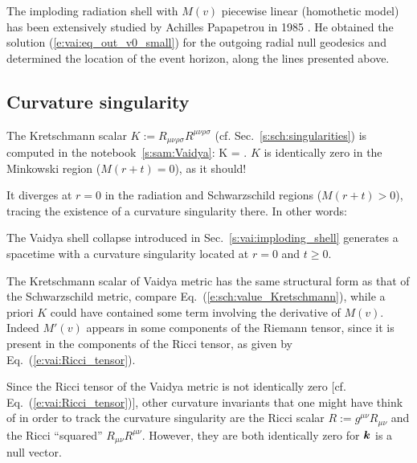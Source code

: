 \begin{hist}
The imploding radiation shell with $M(v)$ piecewise linear (homothetic model)
has been extensively
studied by Achilles Papapetrou in 1985 \cite{Papap85}.
He obtained the solution (\ref{e:vai:eq_out_v0_small}) for the outgoing radial
null geodesics and determined the location of the event horizon, along
the lines presented above.
\end{hist}

\subsection{Curvature singularity} \label{s:vai:thin:sing}

The Kretschmann scalar
$K := R_{\mu\nu\rho\sigma} R^{\mu\nu\rho\sigma}$
(cf. Sec.~\ref{s:sch:singularities})
is computed in the notebook~\ref{s:sam:Vaidya}:
\be \label{e:vai:Kretschmann}
    K =  .
\ee
$K$ is identically zero in the Minkowski region ($M(r+t) = 0$), as it should!

It diverges at $r=0$ in the radiation and Schwarzschild regions ($M(r+t) > 0$), tracing the
existence of a curvature singularity there.
In other words:
\begin{greybox}
The Vaidya shell collapse introduced in Sec.~\ref{s:vai:imploding_shell}
generates a spacetime with a curvature singularity
located at $r=0$ and $t \geq 0$.
\end{greybox}

\begin{remark}
The Kretschmann scalar of Vaidya metric has the same structural form
as that of the Schwarzschild metric, compare Eq.~(\ref{e:sch:value_Kretschmann}),
while a priori $K$ could have
contained some term involving the derivative of $M(v)$. Indeed $M'(v)$
appears in some components of the Riemann tensor, since it is present in the
components of the Ricci tensor, as given by Eq.~(\ref{e:vai:Ricci_tensor}).
\end{remark}

\begin{remark}
Since the Ricci tensor of the Vaidya metric is not identically zero
[cf. Eq.~(\ref{e:vai:Ricci_tensor})], other curvature invariants that one might
have think of in order to track the curvature singularity are the Ricci scalar $R := g^{\mu\nu} R_{\mu\nu}$
and the Ricci ``squared'' $R_{\mu\nu} R^{\mu\nu}$. However, they are both identically zero
for $\bm{k}$ is a null vector.
\end{remark}

